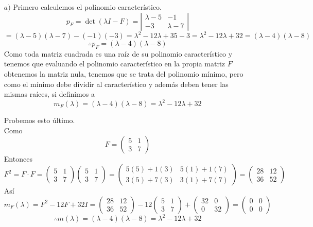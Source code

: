 \begin{enumerate}
\item[$a)$] Primero calculemos el polinomio característico.
\[ p_F=\det( \lambda I-F)= \left| \begin{array}{cc}	
\lambda-5 & -1\\
-3 & \lambda -7 \end{array} \right| \]
\[ = (\lambda -5)(\lambda -7)- (-1)(-3)=\lambda ^2-12\lambda+35-3=\lambda ^2 -12\lambda +32=(\lambda-4)(\lambda-8)\]
\[\therefore p_F =(\lambda-4)(\lambda-8) \]
Como toda matriz cuadrada es una raíz de su polinomio característico y tenemos que evaluando el polinomio característico en la propia matriz $F$ obtenemos la matriz nula, tenemos que se trata del polinomio mínimo, pero como el m\'inimo debe dividir al caracter\'istico y adem\'as deben tener las mismas ra\'ices, si definimos a
\[m_F(\lambda)=(\lambda-4)(\lambda-8)=\lambda ^2 -12\lambda +32\]

Probemos esto último.\\Como
\[F = \begin{pmatrix}
	5 & 1 \\
	3 & 7 \end{pmatrix} \]
Entonces
\[F^2=F\cdot F=\begin{pmatrix}
	5 & 1 \\
	3 & 7 \end{pmatrix} \begin{pmatrix}
	5 & 1 \\
	3 & 7 \end{pmatrix}=\begin{pmatrix}
	5(5)+1(3) & 5(1)+1(7) \\
	3(5)+7(3) & 3(1)+7(7) \end{pmatrix}=\begin{pmatrix}
	28 & 12 \\
	36 & 52 \end{pmatrix}\]
Así
\[ m_F(\lambda)= F^2-12F+32I = \begin{pmatrix}
	28 & 12 \\
	36 & 52 \end{pmatrix}-12\begin{pmatrix}
	5 & 1 \\
	3 & 7 \end{pmatrix}+\begin{pmatrix}
	32 & 0 \\
	0 & 32 \end{pmatrix}=\begin{pmatrix}
	0 & 0 \\
	0 & 0 \end{pmatrix}   \]
\[\therefore m(\lambda) =(\lambda-4)(\lambda-8)= \lambda ^2 -12\lambda +32 \]



\end{enumerate}
